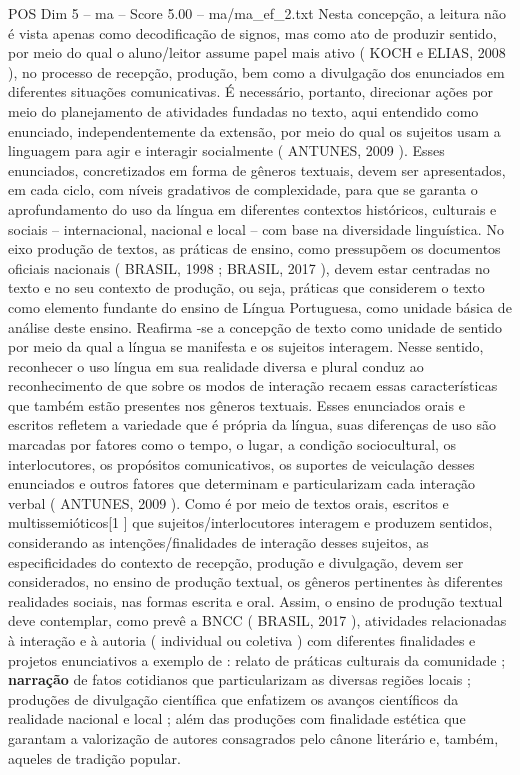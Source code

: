 \begin{textsample}{POS Dim 5 – ma – Score 5.00 – ma/ma\_ef\_2.txt}
Nesta concepção, a leitura não é vista apenas como decodificação de signos, mas como ato de produzir sentido, por meio do qual o aluno/leitor assume papel mais ativo ( KOCH e ELIAS, 2008 ), no processo de recepção, produção, bem como a divulgação dos enunciados em diferentes situações comunicativas.
É necessário, portanto, direcionar ações por meio do planejamento de atividades fundadas no texto, aqui entendido como enunciado, independentemente da extensão, por meio do qual os sujeitos usam a linguagem para agir e interagir socialmente ( ANTUNES, 2009 ).
Esses enunciados, concretizados em forma de gêneros textuais, devem ser apresentados, em cada ciclo, com níveis gradativos de complexidade, para que se garanta o aprofundamento do uso da língua em diferentes contextos históricos, culturais e sociais – internacional, nacional e local – com base na diversidade linguística.
No eixo produção de textos, as práticas de ensino, como pressupõem os documentos oficiais nacionais ( BRASIL, 1998 ; BRASIL, 2017 ), devem estar centradas no texto e no seu contexto de produção, ou seja, práticas que considerem o texto como elemento fundante do ensino de Língua Portuguesa, como unidade básica de análise deste ensino.
Reafirma -se a concepção de texto como unidade de sentido por meio da qual a língua se manifesta e os sujeitos interagem.
Nesse sentido, reconhecer o uso língua em sua realidade diversa e plural conduz ao reconhecimento de que sobre os modos de interação recaem essas características que também estão presentes nos gêneros textuais.
Esses enunciados orais e escritos refletem a variedade que é própria da língua, suas diferenças de uso são marcadas por fatores como o tempo, o lugar, a condição sociocultural, os interlocutores, os propósitos comunicativos, os suportes de veiculação desses enunciados e outros fatores que determinam e particularizam cada interação verbal ( ANTUNES, 2009 ).
Como é por meio de textos orais, escritos e multissemióticos[1 ] que sujeitos/interlocutores interagem e produzem sentidos, considerando as intenções/finalidades de interação desses sujeitos, as especificidades do contexto de recepção, produção e divulgação, devem ser considerados, no ensino de produção textual, os gêneros pertinentes às diferentes realidades sociais, nas formas escrita e oral.
Assim, o ensino de produção textual deve contemplar, como prevê a BNCC ( BRASIL, 2017 ), atividades relacionadas à interação e à autoria ( individual ou coletiva ) com diferentes finalidades e projetos enunciativos a exemplo de : relato de práticas culturais da comunidade ; \textbf{narração} de fatos cotidianos que particularizam as diversas regiões locais ; produções de divulgação científica que enfatizem os avanços científicos da realidade nacional e local ; além das produções com finalidade estética que garantam a valorização de autores consagrados pelo cânone literário e, também, aqueles de tradição popular.

\end{textsample}
